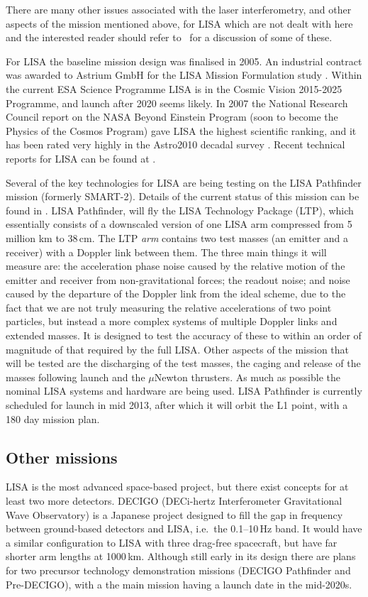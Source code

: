 \documentclass{article}
\begin{document}
There are many other issues associated with the laser interferometry, and other
aspects of the mission mentioned above, for LISA which are not dealt with here
and the interested reader should refer to~\cite{Houghetal, Jennrich:2009,
Johann:2008} for a discussion of some of these.

For LISA the baseline mission design was finalised in 2005. An industrial
contract was awarded to Astrium GmbH for the LISA Mission Formulation study
\cite{Johann:2008}. Within the current ESA Science Programme LISA is in the
Cosmic Vision 2015-2025 Programme, and launch after 2020 seems likely.
In 2007 the National Research Council report on the NASA Beyond Einstein Program
(soon to become the Physics of the Cosmos Program) gave LISA the highest
scientific ranking, and it has been rated very highly in the Astro2010 decadal
survey \cite{astro2010}. Recent technical reports for LISA can be found at
\cite{LISATechReports}.

Several of the key technologies for LISA are being testing on the LISA
Pathfinder mission (formerly SMART-2). Details of the current status of this
mission can be found in \cite{Armano:2009}. LISA Pathfinder, will fly the LISA
Technology Package (LTP), which essentially consists of a downscaled version of
one LISA arm compressed from 5 million km to 38\,cm. The LTP {\it arm} contains
two test masses (an emitter and a receiver) with a Doppler link between them.
The three main things it will measure are: the acceleration phase noise caused
by the relative motion of the emitter and receiver from non-gravitational
forces; the readout noise; and noise caused by the departure of the Doppler link
from the ideal scheme, due to the fact that we are not truly measuring the
relative accelerations of two point particles, but instead a more complex
systems of multiple Doppler links and extended masses. It is designed to test
the accuracy of these to within an order  of magnitude of that required by
the full LISA. Other aspects of the mission that will be tested are the
discharging of the test masses, the caging and release of the masses following
launch and the $\mu$Newton thrusters. As much as possible the nominal LISA
systems and hardware are being used. LISA Pathfinder is currently scheduled for
launch in mid 2013, after which it will orbit the L1 point, with a 180 day
mission plan.

\subsection{Other missions}
LISA is the most advanced space-based project, but there exist concepts for at
least two more detectors. DECIGO (DECi-hertz Interferometer Gravitational Wave
Observatory) \cite{Sato:2009} is a Japanese project designed to fill the gap in
frequency between ground-based detectors and LISA, i.e.\ the 0.1--10\,Hz band. It
would have a similar configuration to LISA with three drag-free spacecraft, but
have far shorter arm lengths at 1000\,km. Although still early in its design
there are plans for two precursor technology demonstration missions (DECIGO
Pathfinder \cite{Ando:2009} and Pre-DECIGO), with a the main mission having a
launch date in the mid-2020s.
\end{document}
